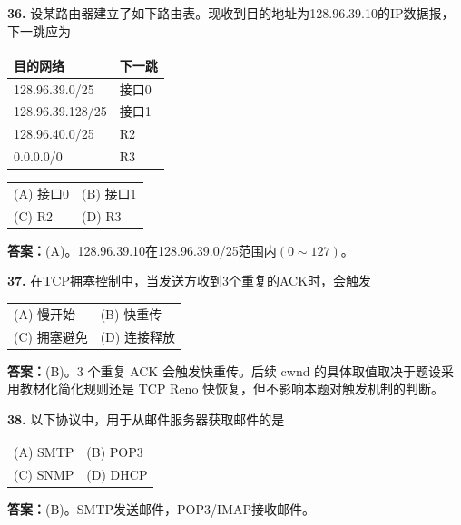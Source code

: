 \noindent\textbf{36.} 设某路由器建立了如下路由表。现收到目的地址为128.96.39.10的IP数据报，下一跳应为
\begin{center}
\begin{tabular}{|l|l|}
\hline
目的网络 & 下一跳 \\
\hline
128.96.39.0/25 & 接口0 \\
128.96.39.128/25 & 接口1 \\
128.96.40.0/25 & R2 \\
0.0.0.0/0 & R3 \\
\hline
\end{tabular}
\end{center}
\begin{tabular}{ll}
(A) 接口0 & (B) 接口1 \\[6pt]
(C) R2 & (D) R3
\end{tabular}

\ifshowsolutions\par\noindent\textbf{答案：}(A)。128.96.39.10在128.96.39.0/25范围内$(0\sim127)$。\else \answerarea \fi

\vspace{6pt}

\noindent\textbf{37.} 在TCP拥塞控制中，当发送方收到3个重复的ACK时，会触发
\begin{center}
\begin{tabular}{ll}
(A) 慢开始 & (B) 快重传 \\[6pt]
(C) 拥塞避免 & (D) 连接释放
\end{tabular}
\end{center}

\ifshowsolutions\par\noindent\textbf{答案：}(B)。3 个重复 ACK 会触发快重传。后续 cwnd 的具体取值取决于题设采用教材化简化规则还是 TCP Reno 快恢复，但不影响本题对触发机制的判断。\else \answerarea \fi

\vspace{6pt}

\noindent\textbf{38.} 以下协议中，用于从邮件服务器获取邮件的是
\begin{center}
\begin{tabular}{ll}
(A) SMTP & (B) POP3 \\[6pt]
(C) SNMP & (D) DHCP
\end{tabular}
\end{center}

\ifshowsolutions\par\noindent\textbf{答案：}(B)。SMTP发送邮件，POP3/IMAP接收邮件。\else \answerarea \fi

